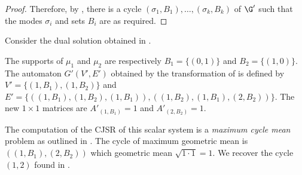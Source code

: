 \begin{proposition}
\begin{proof}
    Therefore, by ,
    there is a cycle $(\sigma_1, B_1), \ldots, (\sigma_k, B_k)$ of $\G'$ such that the modes $\sigma_i$ and sets $B_i$ are as required.
  \end{proof}
\end{proposition}

\begin{myexem}
  \label{exem:simple05}
  Consider the dual solution obtained in .

  The supports of $\mu_1$ and $\mu_2$ are respectively $B_1 = \{(0, 1)\}$ and $B_2 = \{(1, 0)\}$.
  The automaton $G'(V', E')$ obtained by the transformation of  is defined by
  $V' = \{(1, B_1), (1, B_2)\}$ and $E' = \{((1, B_1), (1, B_2), (1, B_1)), ((1, B_2), (1, B_1), (2, B_2))\}$.
  The new $1 \times 1$ matrices are $A'_{(1, B_1)} = 1$ and $A'_{(2, B_2)} = 1$.

  The computation of the CJSR of this scalar system is a \emph{maximum cycle mean} problem
  as outlined in \cite{ahmadi2012joint}.
  The cycle of maximum geometric mean is $((1, B_1), (2, B_2))$ which geometric mean $\sqrt{1 \cdot 1} = 1$.
  We recover the cycle $(1, 2)$ found in .
\end{myexem}
